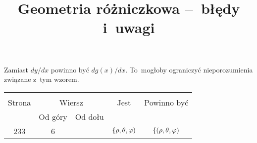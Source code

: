 \documentclass[a4paper,11pt]{article}
\title{Geometria różniczkowa --~błędy i~uwagi}
\begin{document}



\maketitle  %










\start {} Zamiast $dy/dx$ powinno być $d g( x )/dx$.
To~mogłoby ograniczyć nieporozumienia związane z~tym wzorem.

\vspace{\spaceFour}


\begin{center}
  \begin{tabular}{|c|c|c|c|c|}
    \hline
    & \multicolumn{2}{c|}{} & & \\
    Strona & \multicolumn{2}{c|}{Wiersz} & Jest
                              & Powinno być \\ \cline{2-3}
    & Od góry & Od dołu & & \\
    \hline
    233 &  6 & & $\{\rho, \theta, \varphi)$ & $\{ ( \rho, \theta, \varphi )$ \\
    \hline
  \end{tabular}
\end{center}

\vspace{\spaceTwo}
\end{document}
